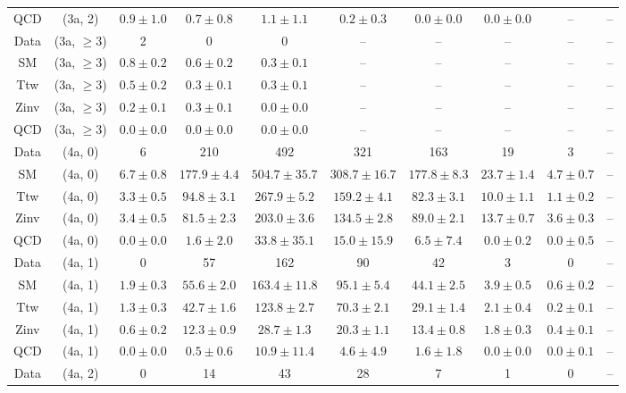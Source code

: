 \begin{table}[h!]
{\begin{tabular}{cccccccccc}
	QCD & (3a, 2) & $0.9\pm 1.0$ & $0.7\pm 0.8$ & $1.1\pm 1.1$ & $0.2\pm 0.3$ & $0.0\pm 0.0$ & $0.0\pm 0.0$ & -- & -- \\[0.5ex] 
	Data & (3a, $\ge3$) & 2 & 0 & 0 & -- & -- & -- & -- & -- \\[0.5ex] 
	SM & (3a, $\ge3$) & $0.8\pm 0.2$ & $0.6\pm 0.2$ & $0.3\pm 0.1$ & -- & -- & -- & -- & -- \\[0.5ex] 
	Ttw & (3a, $\ge3$) & $0.5\pm 0.2$ & $0.3\pm 0.1$ & $0.3\pm 0.1$ & -- & -- & -- & -- & -- \\[0.5ex] 
	Zinv & (3a, $\ge3$) & $0.2\pm 0.1$ & $0.3\pm 0.1$ & $0.0\pm 0.0$ & -- & -- & -- & -- & -- \\[0.5ex] 
	QCD & (3a, $\ge3$) & $0.0\pm 0.0$ & $0.0\pm 0.0$ & $0.0\pm 0.0$ & -- & -- & -- & -- & -- \\[0.5ex] 
	Data & (4a, 0) & 6 & 210 & 492 & 321 & 163 & 19 & 3 & -- \\[0.5ex] 
	SM & (4a, 0) & $6.7\pm 0.8$ & $177.9\pm 4.4$ & $504.7\pm 35.7$ & $308.7\pm 16.7$ & $177.8\pm 8.3$ & $23.7\pm 1.4$ & $4.7\pm 0.7$ & -- \\[0.5ex] 
	Ttw & (4a, 0) & $3.3\pm 0.5$ & $94.8\pm 3.1$ & $267.9\pm 5.2$ & $159.2\pm 4.1$ & $82.3\pm 3.1$ & $10.0\pm 1.1$ & $1.1\pm 0.2$ & -- \\[0.5ex] 
	Zinv & (4a, 0) & $3.4\pm 0.5$ & $81.5\pm 2.3$ & $203.0\pm 3.6$ & $134.5\pm 2.8$ & $89.0\pm 2.1$ & $13.7\pm 0.7$ & $3.6\pm 0.3$ & -- \\[0.5ex] 
	QCD & (4a, 0) & $0.0\pm 0.0$ & $1.6\pm 2.0$ & $33.8\pm 35.1$ & $15.0\pm 15.9$ & $6.5\pm 7.4$ & $0.0\pm 0.2$ & $0.0\pm 0.5$ & -- \\[0.5ex] 
	Data & (4a, 1) & 0 & 57 & 162 & 90 & 42 & 3 & 0 & -- \\[0.5ex] 
	SM & (4a, 1) & $1.9\pm 0.3$ & $55.6\pm 2.0$ & $163.4\pm 11.8$ & $95.1\pm 5.4$ & $44.1\pm 2.5$ & $3.9\pm 0.5$ & $0.6\pm 0.2$ & -- \\[0.5ex] 
	Ttw & (4a, 1) & $1.3\pm 0.3$ & $42.7\pm 1.6$ & $123.8\pm 2.7$ & $70.3\pm 2.1$ & $29.1\pm 1.4$ & $2.1\pm 0.4$ & $0.2\pm 0.1$ & -- \\[0.5ex] 
	Zinv & (4a, 1) & $0.6\pm 0.2$ & $12.3\pm 0.9$ & $28.7\pm 1.3$ & $20.3\pm 1.1$ & $13.4\pm 0.8$ & $1.8\pm 0.3$ & $0.4\pm 0.1$ & -- \\[0.5ex] 
	QCD & (4a, 1) & $0.0\pm 0.0$ & $0.5\pm 0.6$ & $10.9\pm 11.4$ & $4.6\pm 4.9$ & $1.6\pm 1.8$ & $0.0\pm 0.0$ & $0.0\pm 0.1$ & -- \\[0.5ex] 
	Data & (4a, 2) & 0 & 14 & 43 & 28 & 7 & 1 & 0 & -- \\[0.5ex] 

\end{tabular}}
\end{table}
